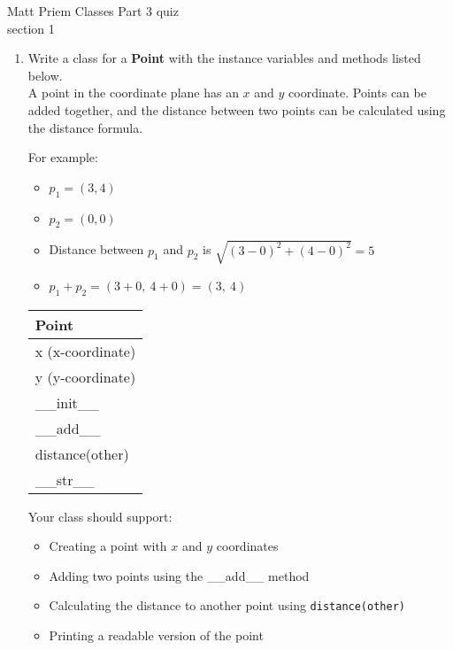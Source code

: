 \documentclass{article}
\begin{document}

Matt Priem \hfill Classes Part 3 quiz\\
section 1\\
\begin{enumerate}
	\item
		Write a class for a \textbf{Point} with the instance variables and methods listed below.\\
		A point in the coordinate plane has an $x$ and $y$ coordinate. Points can be added together, 
		and the distance between two points can be calculated using the distance formula.
			
		\begin{minipage}[t]{0.65\textwidth}
			For example:
			\begin{itemize}
				\item $p_1 = (3, 4)$
				\item $p_2 = (0, 0)$
				\item Distance between $p_1$ and $p_2$ is $\sqrt{(3 - 0)^2 + (4 - 0)^2} = 5$
				\item $p_1 + p_2 = (3 + 0,\ 4 + 0) = (3,\ 4)$
			\end{itemize}
		\end{minipage}
		\hfill
		\begin{minipage}[t]{0.32\textwidth}
			\vspace{.2em}
			\begin{flushright}
				\begin{tabular}{|l|}
					\hline
					Point \\ \hline
					x (x-coordinate) \\
					y (y-coordinate) \\ \hline
					\_\_init\_\_ \\
					\_\_add\_\_ \\
					distance(other) \\
					\_\_str\_\_ \\ \hline
				\end{tabular}
			\end{flushright}
		\end{minipage}
		
		Your class should support:
		\begin{itemize}
			\item Creating a point with $x$ and $y$ coordinates
			\item Adding two points using the \_\_add\_\_ method
			\item Calculating the distance to another point using \texttt{distance(other)}
			\item Printing a readable version of the point
		\end{itemize}
		

\end{enumerate}
\end{document}
